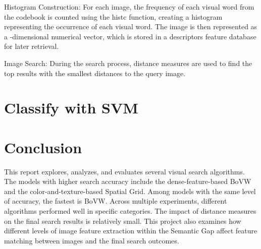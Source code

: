 \documentclass{article}
\begin{document}
​Histogram Construction: For each image, the frequency of each visual word from the codebook is counted using the histc function, creating a histogram representing the occurrence of each visual word. The image is then represented as a -dimensional numerical vector, which is stored in a descriptors feature database for later retrieval.

Image Search: During the search process, distance measures are used to find the top results with the smallest distances to the query image.


\section{Classify with SVM}


\section{Conclusion}

This report explores, analyzes, and evaluates several visual search algorithms. The models with higher search accuracy include the dense-feature-based BoVW and the color-and-texture-based Spatial Grid. Among models with the same level of accuracy, the fastest is BoVW. Across multiple experiments, different algorithms performed well in specific categories. The impact of distance measures on the final search results is relatively small. This project also examines how different levels of image feature extraction within the Semantic Gap affect feature matching between images and the final search outcomes.


\newcommand{\doi}[1]{DOI: \href{http://dx.doi.org/#1}{\nolinkurl{#1}}}



\end{document}
